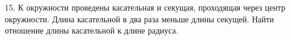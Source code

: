15. К окружности проведены касательная и секущая, проходящая через центр окружности. Длина касательной в два раза меньше длины секущей. Найти отношение длины касательной к длине радиуса.\\
